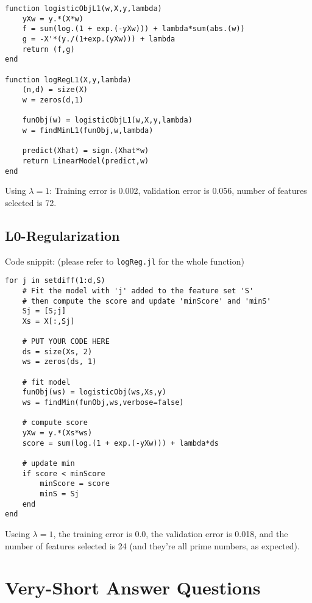 \documentclass{article}
\begin{document}
\begin{verbatim}
function logisticObjL1(w,X,y,lambda)
    yXw = y.*(X*w)
    f = sum(log.(1 + exp.(-yXw))) + lambda*sum(abs.(w))
    g = -X'*(y./(1+exp.(yXw))) + lambda
    return (f,g)
end

function logRegL1(X,y,lambda)
    (n,d) = size(X)
    w = zeros(d,1)

    funObj(w) = logisticObjL1(w,X,y,lambda)
    w = findMinL1(funObj,w,lambda)

    predict(Xhat) = sign.(Xhat*w)
    return LinearModel(predict,w)
end
\end{verbatim}
 Using $\lambda = 1$: Training error is 0.002, validation error is 0.056, number of features selected is 72.


\subsection{L0-Regularization}

Code snippit: (please refer to \texttt{logReg.jl} for the whole function)
\begin{verbatim}
for j in setdiff(1:d,S)
    # Fit the model with 'j' added to the feature set 'S'
    # then compute the score and update 'minScore' and 'minS'
    Sj = [S;j]
    Xs = X[:,Sj]

    # PUT YOUR CODE HERE
    ds = size(Xs, 2)
    ws = zeros(ds, 1)

    # fit model
    funObj(ws) = logisticObj(ws,Xs,y)
    ws = findMin(funObj,ws,verbose=false)

    # compute score
    yXw = y.*(Xs*ws)
    score = sum(log.(1 + exp.(-yXw))) + lambda*ds

    # update min
    if score < minScore
        minScore = score
        minS = Sj
    end
end
\end{verbatim}

Useing $\lambda = 1$, the training error is 0.0, the validation error is 0.018, and the number of features selected is 24 (and they're all prime numbers, as expected).

\section{Very-Short Answer Questions}
\end{document}
